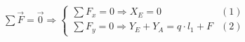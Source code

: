 \documentclass[preview]{standalone}
\begin{document}
\begin{align*}
\sum \Vec{F} = \Vec{0} \Longrightarrow \left\{\begin{array}{lc}\sum F_x = 0 \Longrightarrow \boxed{X_E = 0} & (1)\\\sum F_y = 0 \Longrightarrow Y_E + Y_A = q\cdot l_1 + F & (2)\end{array}\right.
\end{align*}
\end{document}

